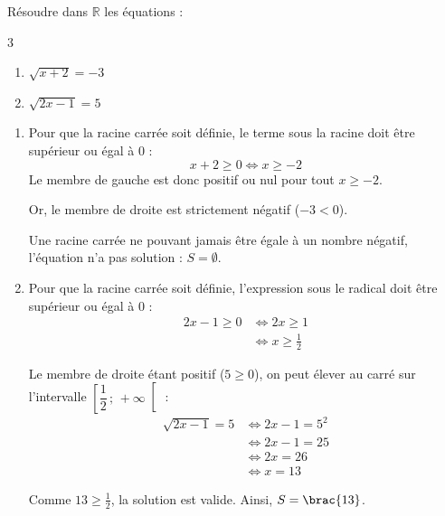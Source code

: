\begin{ex}
	Résoudre dans $\mathbb{R}$ les équations :
	\begin{multicols}{3}
		\begin{enumerate}
			\item $\sqrt{x + 2} = -3$
			\item $\sqrt{2x - 1} = 5$
		\end{enumerate}
	\end{multicols}

	\begin{correction}
		\nline
		\begin{enumerate}
			\item Pour que la racine carrée soit définie, le terme sous la racine doit être supérieur ou égal à $0$ :
			      \[
				      x + 2 \ge 0 \iff x \ge -2
			      \]
			      Le membre de gauche est donc positif ou nul pour tout $x \ge -2$.

			      Or, le membre de droite est strictement négatif ($-3 < 0$).

			      Une racine carrée ne pouvant jamais être égale à un nombre négatif, l'équation n'a pas solution : $S = \emptyset$.

			\item Pour que la racine carrée soit définie, l'expression sous le radical doit être supérieur ou égal à $0$ :
			      \begin{align*}
				      2x - 1 \ge 0 & \iff 2x \ge 1          \\
				                   & \iff x \ge \frac{1}{2}
			      \end{align*}

			      Le membre de droite étant positif ($5 \ge 0$), on peut élever au carré sur l'intervalle $\left[ \dfrac{1}{2}\,;\, + \infty \right[$ :
			      \begin{align*}
				      \sqrt{2x - 1} = 5 & \iff 2x - 1 = 5^2 \\
				                        & \iff 2x - 1 = 25  \\
				                        & \iff 2x = 26      \\
				                        & \iff x = 13
			      \end{align*}

			      Comme $13 \ge \frac{1}{2}$, la solution est valide. Ainsi, $S = \brac{13}$.
		\end{enumerate}
	\end{correction}
\end{ex}

